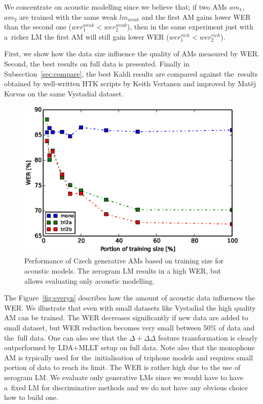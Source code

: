 We concentrate on acoustic modelling since we believe that; if two \acp{AM} $am_1$, $am_2$ are trained with the same weak $lm_{weak}$ and the first \ac{AM} gains lower \ac{WER} than the second one ($wer^{weak}_{1} <  wer^{weak}_{2}$), then in the same experiment just with a~richer \ac{LM} the first \ac{AM} will still gain lower \ac{WER} ($wer^{rich}_{1} <  wer^{rich}_{2}$).

First, we show how the data size influence the quality of \acp{AM} measured by \ac{WER}.
Second,  the best results on full data is presented.
Finally in Subsection~\ref{sec:compare}, the best Kaldi results are compared against the~results obtained by well-written \ac{HTK} scripts by Keith Vertanen and improved by Matěj Korvas \cite{korvas_2014} on the same Vystadial dataset.

\begin{figure}[!htp]
    \begin{center}
    \includegraphics[scale=0.7]{images/partial-zerogram.ps}
    \caption{Performance of Czech generative \acp{AM} based on training size for acoustic models. The zerogram LM results in a high WER, but allows evaluating only acoustic modelling.}
    \label{fig:partials} 
    \end{center}
\end{figure}

The Figure~\ref{fig:everyn} describes how the amount of acoustic data influences the \ac{WER}.
We illustrate that even with small datasets like Vystadial the high quality \ac{AM} can be trained.
The WER decreases significantly if new data are added to small dataset, but \ac{WER} reduction becomes very small between 50\% of data and the~full data.
One can also see that the $\Delta+\Delta\Delta$ feature transformation is clearly outperformed by \ac{LDA}+\ac{MLLT} setup on full data.
Note also that the monophone \ac{AM} is typically used for the~initialisation of triphone models and requires small portion of data to reach its limit.
The WER is rather high due to the use of zerogram \ac{LM}.
We evaluate only generative \acp{LM} since we would have to have a~fixed LM for discriminative methods and we do not have any obvious choice how to build one.

